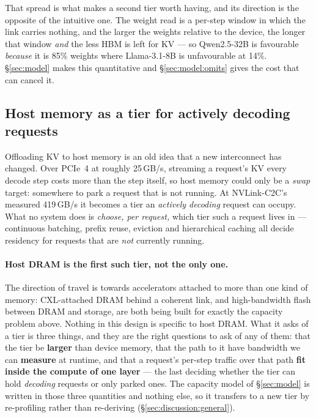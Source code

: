 That spread is what makes a second tier worth having, and its direction is the
opposite of the intuitive one. The weight read is a per-step window in which the link
carries nothing, and the larger the weights relative to the device, the longer that
window \emph{and} the less HBM is left for KV --- so Qwen2.5-32B is favourable
\emph{because} it is 85\% weights where Llama-3.1-8B is unfavourable at 14\%.
\S\ref{sec:model} makes this quantitative and \S\ref{sec:model:omits} gives the cost
that can cancel it.

\subsection{Host memory as a tier for actively decoding requests}

Offloading KV to host memory is an old idea that a new interconnect has changed.
Over PCIe~4 at roughly 25\,GB/s, streaming a request's KV every decode step costs
more than the step itself, so host memory could only be a \emph{swap} target:
somewhere to park a request that is not running. At NVLink-C2C's measured
419\,GB/s it becomes a tier an \emph{actively decoding} request can occupy. What no
system does is \emph{choose, per request,} which tier such a request lives in ---
continuous batching, prefix reuse, eviction and hierarchical caching all decide
residency for requests that are \emph{not} currently running.

\paragraph{Host DRAM is the first such tier, not the only one.} The direction of
travel is towards accelerators attached to more than one kind of memory:
CXL-attached DRAM behind a coherent link, and high-bandwidth flash between DRAM and
storage, are both being built for exactly the capacity problem above. Nothing in
this design is specific to host DRAM. What it asks of a tier is three things, and
they are the right questions to ask of any of them: that the tier be
\textbf{larger} than device memory, that the path to it have bandwidth we can
\textbf{measure} at runtime, and that a request's per-step traffic over that path
\textbf{fit inside the compute of one layer} --- the last deciding whether the tier
can hold \emph{decoding} requests or only parked ones. The capacity model of
\S\ref{sec:model} is written in those three quantities and nothing else, so it
transfers to a new tier by re-profiling rather than re-deriving
(\S\ref{sec:discussion:general}).

